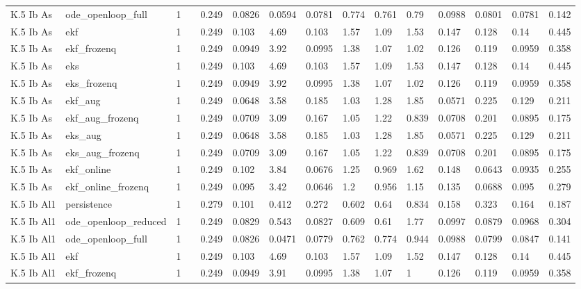\begin{table}[t]
\begin{tabular}{lllllllllllllll}
K.5 Ib As & ode\_openloop\_full & 1 &  & 0.249 & 0.0826 & 0.0594 & 0.0781 & 0.774 & 0.761 & 0.79 & 0.0988 & 0.0801 & 0.0781 & 0.142 \\
K.5 Ib As & ekf & 1 &  & 0.249 & 0.103 & 4.69 & 0.103 & 1.57 & 1.09 & 1.53 & 0.147 & 0.128 & 0.14 & 0.445 \\
K.5 Ib As & ekf\_frozenq & 1 &  & 0.249 & 0.0949 & 3.92 & 0.0995 & 1.38 & 1.07 & 1.02 & 0.126 & 0.119 & 0.0959 & 0.358 \\
K.5 Ib As & eks & 1 &  & 0.249 & 0.103 & 4.69 & 0.103 & 1.57 & 1.09 & 1.53 & 0.147 & 0.128 & 0.14 & 0.445 \\
K.5 Ib As & eks\_frozenq & 1 &  & 0.249 & 0.0949 & 3.92 & 0.0995 & 1.38 & 1.07 & 1.02 & 0.126 & 0.119 & 0.0959 & 0.358 \\
K.5 Ib As & ekf\_aug & 1 &  & 0.249 & 0.0648 & 3.58 & 0.185 & 1.03 & 1.28 & 1.85 & 0.0571 & 0.225 & 0.129 & 0.211 \\
K.5 Ib As & ekf\_aug\_frozenq & 1 &  & 0.249 & 0.0709 & 3.09 & 0.167 & 1.05 & 1.22 & 0.839 & 0.0708 & 0.201 & 0.0895 & 0.175 \\
K.5 Ib As & eks\_aug & 1 &  & 0.249 & 0.0648 & 3.58 & 0.185 & 1.03 & 1.28 & 1.85 & 0.0571 & 0.225 & 0.129 & 0.211 \\
K.5 Ib As & eks\_aug\_frozenq & 1 &  & 0.249 & 0.0709 & 3.09 & 0.167 & 1.05 & 1.22 & 0.839 & 0.0708 & 0.201 & 0.0895 & 0.175 \\
K.5 Ib As & ekf\_online & 1 &  & 0.249 & 0.102 & 3.84 & 0.0676 & 1.25 & 0.969 & 1.62 & 0.148 & 0.0643 & 0.0935 & 0.255 \\
K.5 Ib As & ekf\_online\_frozenq & 1 &  & 0.249 & 0.095 & 3.42 & 0.0646 & 1.2 & 0.956 & 1.15 & 0.135 & 0.0688 & 0.095 & 0.279 \\
K.5 Ib Al1 & persistence & 1 &  & 0.279 & 0.101 & 0.412 & 0.272 & 0.602 & 0.64 & 0.834 & 0.158 & 0.323 & 0.164 & 0.187 \\
K.5 Ib Al1 & ode\_openloop\_reduced & 1 &  & 0.249 & 0.0829 & 0.543 & 0.0827 & 0.609 & 0.61 & 1.77 & 0.0997 & 0.0879 & 0.0968 & 0.304 \\
K.5 Ib Al1 & ode\_openloop\_full & 1 &  & 0.249 & 0.0826 & 0.0471 & 0.0779 & 0.762 & 0.774 & 0.944 & 0.0988 & 0.0799 & 0.0847 & 0.141 \\
K.5 Ib Al1 & ekf & 1 &  & 0.249 & 0.103 & 4.69 & 0.103 & 1.57 & 1.09 & 1.52 & 0.147 & 0.128 & 0.14 & 0.445 \\
K.5 Ib Al1 & ekf\_frozenq & 1 &  & 0.249 & 0.0949 & 3.91 & 0.0995 & 1.38 & 1.07 & 1 & 0.126 & 0.119 & 0.0959 & 0.358 \\

\end{tabular}
\end{table}
